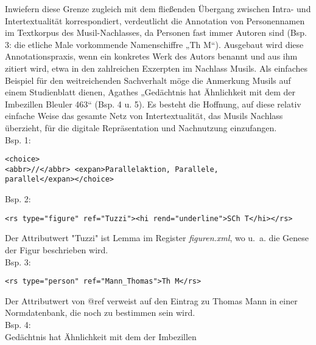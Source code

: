 \documentclass{article}
\begin{document}
        Inwiefern diese Grenze zugleich mit dem fließenden Übergang zwischen Intra- und
                  Intertextualität korrespondiert, verdeutlicht die Annotation von Personennamen im
                  Textkorpus des Musil-Nachlasses, da Personen fast immer Autoren sind (Bsp. 3: die
                  etliche Male vorkommende Namenschiffre „Th M“). Ausgebaut wird diese
                  Annotationspraxis, wenn ein konkretes Werk des Autors benannt und aus ihm zitiert
                  wird, etwa in den zahlreichen Exzerpten im Nachlass Musils. Als einfaches Beispiel
                  für den weitreichenden Sachverhalt möge die Anmerkung Musils auf einem
                  Studienblatt dienen, Agathes „Gedächtnis hat Ähnlichkeit mit dem der Imbezillen
                  Bleuler 463“ (Bsp. 4 u. 5). Es besteht die Hoffnung, auf diese relativ einfache
                  Weise das gesamte Netz von Intertextualität, das Musils Nachlass überzieht, für
                  die digitale Repräsentation und Nachnutzung einzufangen.\\
            
        Bsp. 1:\\
            
        \begin{verbatim}<choice>
<abbr>//</abbr> <expan>Parallelaktion, Parallele,
parallel</expan></choice>\end{verbatim}Bsp. 2:\\
            
        \begin{verbatim}<rs type="figure" ref="Tuzzi"><hi rend="underline">SCh T</hi></rs>\end{verbatim}Der Attributwert "Tuzzi" ist Lemma im Register \emph{figuren.xml},
                  wo u. a. die Genese der Figur beschrieben wird.\\
            
        Bsp. 3:\\
            
        \begin{verbatim}<rs type="person" ref="Mann_Thomas">Th M</rs>\end{verbatim}Der Attributwert von @ref verweist auf den Eintrag zu Thomas Mann in einer Normdatenbank,
                  die noch zu bestimmen sein wird.\\
            
        Bsp. 4:\\
            
        Gedächtnis hat Ähnlichkeit mit dem der Imbezillen\\
            
\end{document}
